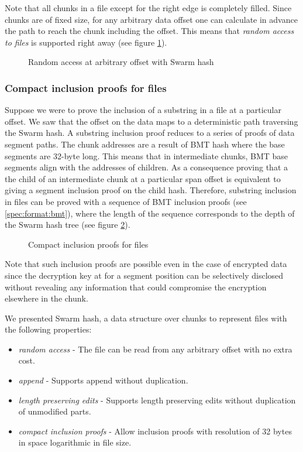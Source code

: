 Note that all chunks in a file except for the right edge is completely filled. Since chunks are of fixed size, for any arbitrary data offset one can calculate in advance the path to reach the chunk including the offset. This means that \emph{random access to files} is supported right away (see figure \ref{fig:random-access}).


\begin{figure}[htbp]
\centering
\caption[Random access at arbitrary offset with Swarm hash]{Random access at arbitrary offset with Swarm hash}
\label{fig:random-access}
\end{figure}

\subsubsection{Compact inclusion proofs for files}

Suppose we were to prove the inclusion of a substring in a file at a particular offset. We saw that the offset on the data maps to a deterministic path traversing the Swarm hash. A substring inclusion proof reduces to a series of proofs of data segment paths. The chunk addresses are a result of BMT hash where the base segments are 32-byte long. This means that in intermediate chunks, BMT base segments align with the addresses of children. As a consequence proving that a the child of an intermediate chunk at a particular span offset is equivalent to giving a segment inclusion proof on the child hash. Therefore, substring inclusion in files can be proved with a sequence of BMT inclusion proofs (see \ref{spec:format:bmt}), where the length of the sequence corresponds to the depth of the Swarm hash tree (see figure \ref{fig:file-inclusion}). 

\begin{figure}[htbp]
\centering
\caption[Compact inclusion proofs for files]{Compact inclusion proofs for files}
\label{fig:file-inclusion}
\end{figure}

Note that such inclusion proofs are possible even in the case of encrypted data since the decryption key at for a segment position can be selectively disclosed without revealing any information that could compromise the encryption elsewhere in the chunk.

We presented Swarm hash, a data structure over chunks to represent files with the following properties:

\begin{itemize}
    \item \emph{random access} - The file can be read from any arbitrary offset with no extra cost.
    \item \emph{append} - Supports append without duplication. 
    \item \emph{length preserving edits} - Supports length preserving edits without duplication of unmodified parts.
    \item \emph{compact inclusion proofs} - Allow inclusion proofs with resolution of 32 bytes in space logarithmic in file size.
\end{itemize}



